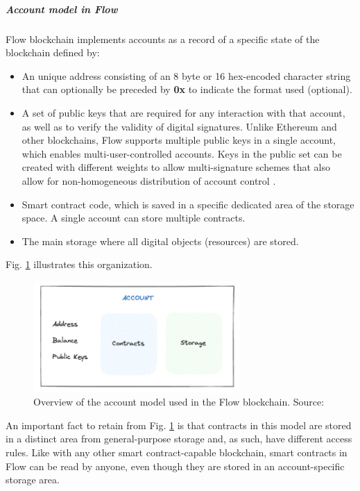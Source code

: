 \documentclass[./4_GeneralApproach.tex]{subfiles}
\begin{document}
    \subparagraph{Account model in Flow}
    \label{flow_accounts}
    Flow blockchain implements accounts as a record of a specific state of the blockchain defined by:
    \begin{itemize}
        \item{An unique address consisting of an 8 byte or 16 hex-encoded character string that can optionally be preceded by \textbf{0x} to indicate the format used (optional).}
        \item{A set of public keys that are required for any interaction with that account, as well as to verify the validity of digital signatures. Unlike Ethereum and other blockchains, Flow supports multiple public keys in a single account, which enables multi-user-controlled accounts. Keys in the public set can be created with different weights to allow multi-signature schemes that also allow for non-homogeneous distribution of account control \cite{flow2024}.}
        \item{Smart contract code, which is saved in a specific dedicated area of the storage space. A single account can store multiple contracts.}
        \item{The main storage where all digital objects (resources) are stored.}
    \end{itemize}

    Fig. \ref{fig:flow_account_model} illustrates this organization.

    \begin{figure}[htp]
        \centering
        \includegraphics[width=0.7\textwidth]{../Images/Flow_account_model.png}
        \caption{Overview of the account model used in the Flow blockchain. Source: \cite{flow2024}}
        \label{fig:flow_account_model}
    \end{figure}

    An important fact to retain from Fig. \ref{fig:flow_account_model} is that contracts in this model are stored in a distinct area from general-purpose storage and, as such, have different access rules. Like with any other smart contract-capable blockchain, smart contracts in Flow can be read by anyone, even though they are stored in an account-specific storage area.
\end{document}
